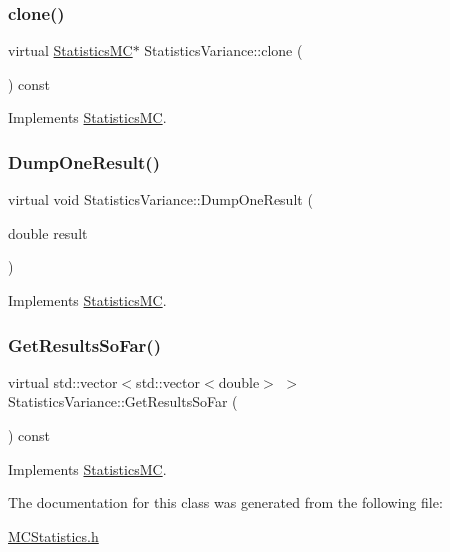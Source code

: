 \subsubsection{\texorpdfstring{clone()}{clone()}}
{\footnotesize\ttfamily virtual \hyperlink{classStatisticsMC}{Statistics\+MC}$\ast$ Statistics\+Variance\+::clone (\begin{DoxyParamCaption}{ }\end{DoxyParamCaption}) const\hspace{0.3cm}{\ttfamily [virtual]}}



Implements \hyperlink{classStatisticsMC_af716d17e088d36f283e112ba736f8002}{Statistics\+MC}.

\hypertarget{classStatisticsVariance_a403368dde195a18fe4ce64e41854d493}{}\label{classStatisticsVariance_a403368dde195a18fe4ce64e41854d493} 
\subsubsection{\texorpdfstring{Dump\+One\+Result()}{DumpOneResult()}}
{\footnotesize\ttfamily virtual void Statistics\+Variance\+::\+Dump\+One\+Result (\begin{DoxyParamCaption}\item[{double}]{result }\end{DoxyParamCaption})\hspace{0.3cm}{\ttfamily [virtual]}}



Implements \hyperlink{classStatisticsMC_a3ab5fb27d6933d8e35b2a55c3897cbe3}{Statistics\+MC}.

\hypertarget{classStatisticsVariance_a755d94e3fd68419d85ab7dbffe5b7e5d}{}\label{classStatisticsVariance_a755d94e3fd68419d85ab7dbffe5b7e5d} 
\subsubsection{\texorpdfstring{Get\+Results\+So\+Far()}{GetResultsSoFar()}}
{\footnotesize\ttfamily virtual std\+::vector$<$std\+::vector$<$double$>$ $>$ Statistics\+Variance\+::\+Get\+Results\+So\+Far (\begin{DoxyParamCaption}{ }\end{DoxyParamCaption}) const\hspace{0.3cm}{\ttfamily [virtual]}}



Implements \hyperlink{classStatisticsMC_ae29a294b6db36c2bf46c20ac30e25aad}{Statistics\+MC}.



The documentation for this class was generated from the following file\+:\begin{DoxyCompactItemize}
\item 
\hyperlink{MCStatistics_8h}{M\+C\+Statistics.\+h}\end{DoxyCompactItemize}
